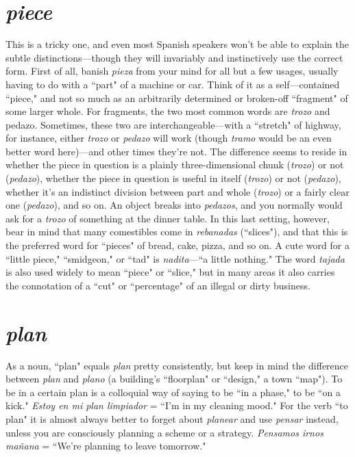\section{\emph{piece}}

This is a tricky one, and even most Spanish speakers won't be
able to explain the subtle distinctions---though they will invariably
and instinctively use the correct form. First of all, banish \emph{pieza} from
your mind for all but a few usages, usually having to do with a ``part"
of a machine or car. Think of it as a self---contained ``piece," and not so
much as an arbitrarily determined or broken-off ``fragment" of some
larger whole.
For fragments, the two most common words are \emph{trozo} and
pedazo. Sometimes, these two are interchangeable---with a ``stretch"
of highway, for instance, either \emph{trozo} or \emph{pedazo} will work (though
\emph{tramo} would be an even better word here)---and other times they're
not. The difference seems to reside in whether the piece in question is
a plainly three-dimensional chunk (\emph{trozo}) or not (\emph{pedazo}), whether the
piece in question is useful in itself (\emph{trozo}) or not (\emph{pedazo}), whether it's
an indistinct division between part and whole (\emph{trozo}) or a fairly clear
one (\emph{pedazo}), and so on. An object breaks into \emph{pedazos}, and you normally would ask for a \emph{trozo} of something at the dinner table.
In this last setting, however, bear in mind that many comestibles come in \emph{rebanadas} (``slices"), and that this is the preferred word
for ``pieces" of bread, cake, pizza, and so on. A cute word for a ``little
piece," ``smidgeon," or ``tad" is \emph{nadita}---``a little nothing." The word
\emph{tajada} is also used widely to mean ``piece" or ``slice," but in many
areas it also carries the connotation of a ``cut" or ``percentage" of an
illegal or dirty business.

\section{\emph{plan}}

As a noun, ``plan" equals \emph{plan} pretty consistently, but keep in
mind the difference between \emph{plan} and \emph{plano} (a building's ``floorplan"
or ``design," a town ``map"). To be in a certain plan is a colloquial way
of saying to be ``in a phase," to be ``on a kick." \emph{Estoy en mi plan limpiador} = ``I'm in my cleaning mood." For the verb ``to plan" it is almost always better to forget about \emph{planear} and use \emph{pensar} instead,
unless you are consciously planning a scheme or a strategy. \emph{Pensamos
irnos mañana} = ``We're planning to leave tomorrow."

